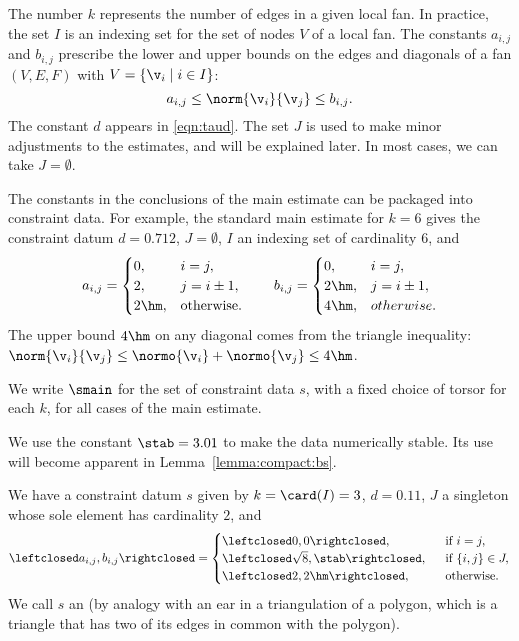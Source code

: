 \begin{remark}
The number $k$ represents the number of edges in a given local fan.
In practice, the set $I$  is an indexing set for the set of nodes $V$ of a local fan.
The constants $a_{i,j}$ and $b_{i,j}$ prescribe the lower and upper bounds
on the edges and diagonals of a fan $(V,E,F)$ with $V=\{\v_i\mid i\in I\}$:
\[
a_{i,j}\le \norm{\v_i}{\v_j} \le b_{i,j}.
\]
The constant $d$ appears in \eqref{eqn:taud}.    The set $J$ is used to
make minor adjustments to the estimates, and will be explained later.
In most cases, we can take $J=\emptyset$.
\end{remark}

\begin{example} The constants in the conclusions of the main estimate
  can be packaged into constraint data.  For example, the standard
  main estimate for $k=6$ gives the constraint datum $d=0.712$, $J=\emptyset$,
  $I$ an indexing set of cardinality $6$,
 and
\[
a_{i,j} = \begin{cases} 0, & i=j,\\
  2, & j= i\pm1,\\
  2 \hm, & \text{otherwise}.
  \end{cases}
\qquad
b_{i,j}=\begin{cases}
 0, & i=j,\\
 2\hm, & j= i\pm1,\\
 4\hm, & otherwise.
  \end{cases}
\]
The upper bound $4\hm$ on any diagonal comes from the triangle
inequality: $\norm{\v_i}{\v_j} \le \normo{\v_i}+\normo{\v_j} \le
4\hm$.   


We write $\smain$ for
the set of constraint data $s$, with a fixed choice of torsor for each $k$,
for all cases of the main estimate.
\end{example}

We use the constant $\stab=3.01$ to make the data numerically stable.
Its use will become apparent in Lemma~\ref{lemma:compact:bs}.

\begin{example}[ear]  We have a constraint datum $s$ given by
$k=\card(I)=3$, $d=0.11$, $J$ a singleton whose sole element has cardinality $2$, 
and
\[
\leftclosed a_{i,j},b_{i,j}\rightclosed=
\begin{cases}
 \leftclosed0,0\rightclosed,
 &\text{~~if } i=j,\\
 \leftclosed\sqrt8,\stab\rightclosed,
 &\text{~~if } \{i,j\} \in J,\\
 \leftclosed 2,2\hm\rightclosed,
 &\text{~~otherwise. }
\end{cases}
\]
We call $s$ an  (by analogy with an ear
in a triangulation of a polygon, which is a triangle that has two of
its edges in common with the polygon).
\end{example}



